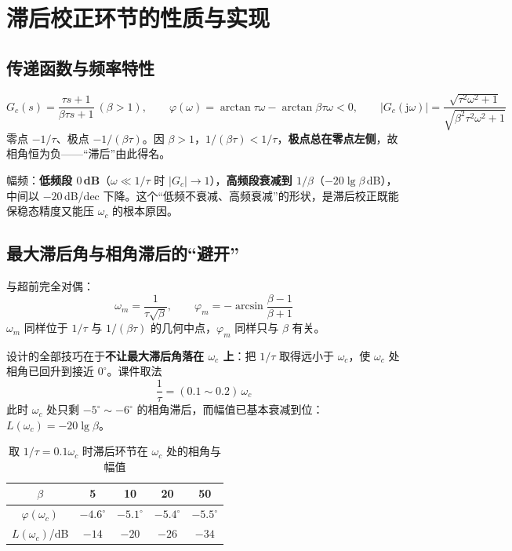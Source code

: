 \bigskip

\section{滞后校正环节的性质与实现}

\subsection{传递函数与频率特性}
\[
G_c(s)=\frac{\tau s+1}{\beta\tau s+1}\ (\beta>1),\qquad
\varphi(\omega)=\arctan\tau\omega-\arctan\beta\tau\omega<0,\qquad
\bigl|G_c(\mathrm{j}\omega)\bigr|=\frac{\sqrt{\tau^{2}\omega^{2}+1}}{\sqrt{\beta^{2}\tau^{2}\omega^{2}+1}}
\]
零点 $-1/\tau$、极点 $-1/(\beta\tau)$。因 $\beta>1$，$1/(\beta\tau)<1/\tau$，\textbf{极点总在零点左侧}，故相角恒为负——“滞后”由此得名。

幅频：\textbf{低频段 $0$\,dB}（$\omega\ll1/\tau$ 时 $|G_c|\to1$），\textbf{高频段衰减到 $1/\beta$}（$-20\lg\beta$\,dB），中间以 $-20$\,dB/dec 下降。这个“低频不衰减、高频衰减”的形状，是滞后校正既能保稳态精度又能压 $\omega_c$ 的根本原因。

\subsection{最大滞后角与相角滞后的“避开”}
与超前完全对偶：
\[
\omega_m=\frac{1}{\tau\sqrt{\beta}},\qquad
\varphi_m=-\arcsin\frac{\beta-1}{\beta+1}
\]
$\omega_m$ 同样位于 $1/\tau$ 与 $1/(\beta\tau)$ 的几何中点，$\varphi_m$ 同样只与 $\beta$ 有关。

设计的全部技巧在于\textbf{不让最大滞后角落在 $\omega_c$ 上}：把 $1/\tau$ 取得远小于 $\omega_c$，使 $\omega_c$ 处相角已回升到接近 $0^\circ$。课件取法
\[
\boxed{\ \frac{1}{\tau}=(0.1\sim0.2)\,\omega_c\ }
\]
此时 $\omega_c$ 处只剩 $-5^\circ\sim-6^\circ$ 的相角滞后，而幅值已基本衰减到位：$L(\omega_c)=-20\lg\beta$。

\begin{table}[htbp]
\centering
\caption{取 $1/\tau=0.1\omega_c$ 时滞后环节在 $\omega_c$ 处的相角与幅值}
\begin{tabular}{ccccc}
\toprule
$\beta$ & 5 & 10 & 20 & 50 \\
\midrule
$\varphi(\omega_c)$ & $-4.6^\circ$ & $-5.1^\circ$ & $-5.4^\circ$ & $-5.5^\circ$ \\
$L(\omega_c)$/dB & $-14$ & $-20$ & $-26$ & $-34$ \\
\bottomrule
\end{tabular}
\end{table}

